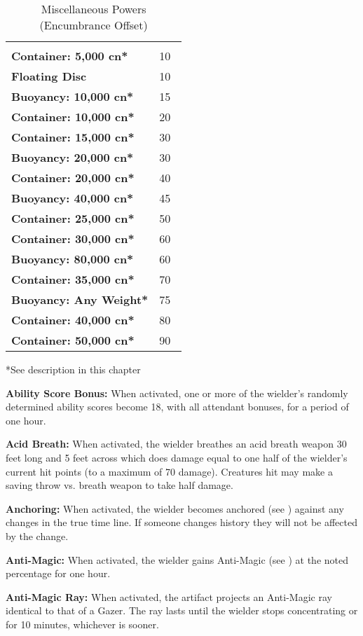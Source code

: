 \begin{multicols*}{2}
\begin {table}[H]
  \caption{Miscellaneous Powers (Encumbrance Offset)}\label{tab:Miscellaneous Powers (Encumbrance Offset)}
  \begin{tabularx}{\columnwidth}{>{\bfseries}YY}
   & \\
	Container: 5,000 cn* & 10\\
	Floating Disc & 10\\
	Buoyancy: 10,000 cn* & 15\\
	Container: 10,000 cn* & 20\\
	Container: 15,000 cn* & 30\\
	Buoyancy: 20,000 cn* & 30\\
	Container: 20,000 cn* & 40\\
	Buoyancy: 40,000 cn* & 45\\
	Container: 25,000 cn* & 50\\
	Container: 30,000 cn* & 60\\
	Buoyancy: 80,000 cn* & 60\\
	Container: 35,000 cn* & 70\\
	Buoyancy: Any Weight* & 75\\
	Container: 40,000 cn* & 80\\
	Container: 50,000 cn* & 90\
  \end {tabularx}
	*See description in this chapter
\end {table}

\textbf{Ability Score Bonus:} When activated, one or more of the wielder’s randomly determined ability scores become 18, with all attendant bonuses, for a period of one hour.

\textbf{Acid Breath:} When activated, the wielder breathes an acid breath weapon 30 feet long and 5 feet across which does damage equal to one half of the wielder’s current hit points (to a maximum of 70 damage). Creatures hit may make a saving throw vs. breath weapon to take half damage.

\textbf{Anchoring:} When activated, the wielder becomes anchored (see ) against any changes in the true time line. If someone changes history they will not be affected by the change.

\textbf{Anti-Magic:} When activated, the wielder gains Anti-Magic (see ) at the noted percentage for one hour.

\textbf{Anti-Magic Ray:} When activated, the artifact projects an Anti-Magic ray identical to that of a Gazer. The ray lasts until the wielder stops concentrating or for 10 minutes, whichever is sooner.


\end{multicols*}
